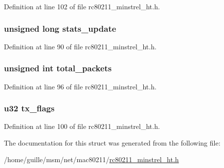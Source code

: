Definition at line 102 of file rc80211\-\_\-minstrel\-\_\-ht.\-h.

\hypertarget{structminstrel__ht__sta_a3c5301bb7fd4073bbad86d50eff8f188}{
\subsubsection[{stats\-\_\-update}]{\setlength{\rightskip}{0pt plus 5cm}unsigned long stats\-\_\-update}}\label{structminstrel__ht__sta_a3c5301bb7fd4073bbad86d50eff8f188}


Definition at line 90 of file rc80211\-\_\-minstrel\-\_\-ht.\-h.

\hypertarget{structminstrel__ht__sta_a6faab394a49c8462592c339de9d60855}{
\subsubsection[{total\-\_\-packets}]{\setlength{\rightskip}{0pt plus 5cm}unsigned int total\-\_\-packets}}\label{structminstrel__ht__sta_a6faab394a49c8462592c339de9d60855}


Definition at line 96 of file rc80211\-\_\-minstrel\-\_\-ht.\-h.

\hypertarget{structminstrel__ht__sta_a428012b2ca384e2898d6389025a7b6db}{
\subsubsection[{tx\-\_\-flags}]{\setlength{\rightskip}{0pt plus 5cm}u32 tx\-\_\-flags}}\label{structminstrel__ht__sta_a428012b2ca384e2898d6389025a7b6db}


Definition at line 100 of file rc80211\-\_\-minstrel\-\_\-ht.\-h.



The documentation for this struct was generated from the following file\-:\begin{DoxyCompactItemize}
\item 
/home/guille/msm/net/mac80211/\hyperlink{rc80211__minstrel__ht_8h}{rc80211\-\_\-minstrel\-\_\-ht.\-h}\end{DoxyCompactItemize}
